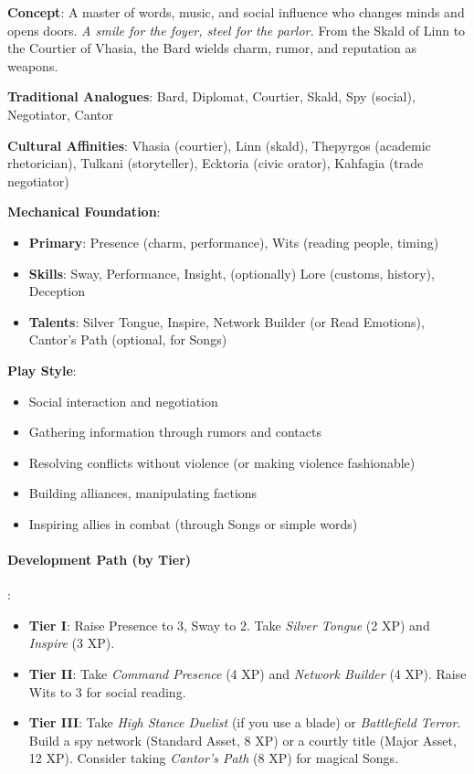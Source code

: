 \textbf{Concept}: A master of words, music, and social influence who changes minds and opens doors. \emph{A smile for the foyer, steel for the parlor.} From the Skald of Linn to the Courtier of Vhasia, the Bard wields charm, rumor, and reputation as weapons.

\textbf{Traditional Analogues}: Bard, Diplomat, Courtier, Skald, Spy (social), Negotiator, Cantor

\textbf{Cultural Affinities}: Vhasia (courtier), Linn (skald), Thepyrgos (academic rhetorician), Tulkani (storyteller), Ecktoria (civic orator), Kahfagia (trade negotiator)

\textbf{Mechanical Foundation}:
\begin{itemize}
\item \textbf{Primary}: Presence (charm, performance), Wits (reading people, timing)
\item \textbf{Skills}: Sway, Performance, Insight, (optionally) Lore (customs, history), Deception
\item \textbf{Talents}: Silver Tongue, Inspire, Network Builder (or Read Emotions), Cantor's Path (optional, for Songs)
\end{itemize}

\textbf{Play Style}:
\begin{itemize}
\item Social interaction and negotiation
\item Gathering information through rumors and contacts
\item Resolving conflicts without violence (or making violence fashionable)
\item Building alliances, manipulating factions
\item Inspiring allies in combat (through Songs or simple words)
\end{itemize}

\paragraph{Development Path (by Tier)}:
\begin{itemize}
\item \textbf{Tier I}: Raise Presence to 3, Sway to 2. Take \emph{Silver Tongue} (2 XP) and \emph{Inspire} (3 XP).
\item \textbf{Tier II}: Take \emph{Command Presence} (4 XP) and \emph{Network Builder} (4 XP). Raise Wits to 3 for social reading.
\item \textbf{Tier III}: Take \emph{High Stance Duelist} (if you use a blade) or \emph{Battlefield Terror}. Build a spy network (Standard Asset, 8 XP) or a courtly title (Major Asset, 12 XP). Consider taking \emph{Cantor's Path} (8 XP) for magical Songs.
\end{itemize}

